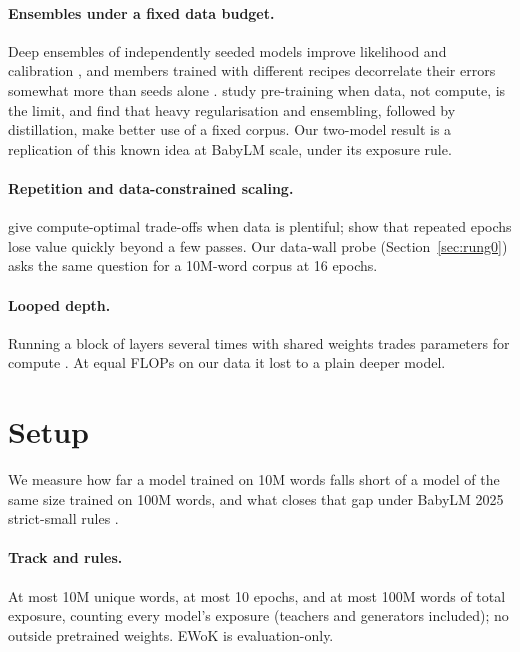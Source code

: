 \documentclass[11pt]{article}
\begin{document}
\paragraph{Ensembles under a fixed data budget.} Deep ensembles of independently seeded models improve likelihood and
calibration \citep{lakshminarayanan2017}, and members trained with different recipes decorrelate their errors somewhat
more than seeds alone \citep{gontijolopes2022}. \citet{kim2025infinite} study pre-training when data, not compute, is
the limit, and find that heavy regularisation and ensembling, followed by distillation, make better use of a fixed
corpus. Our two-model result is a replication of this known idea at BabyLM scale, under its exposure rule.

\paragraph{Repetition and data-constrained scaling.} \citet{hoffmann2022chinchilla} give compute-optimal trade-offs when
data is plentiful; \citet{muennighoff2023scaling} show that repeated epochs lose value quickly beyond a few passes. Our
data-wall probe (Section~\ref{sec:rung0}) asks the same question for a 10M-word corpus at 16 epochs.

\paragraph{Looped depth.} Running a block of layers several times with shared weights trades parameters for compute
\citep{chen2026looped,parcae2026,ouro2025}. At equal FLOPs on our data it lost to a plain deeper model.

\section{Setup}
\label{sec:setup}
We measure how far a model trained on 10M words falls short of a model of the same size trained on 100M words, and what closes
that gap under BabyLM 2025 strict-small rules \citep{babylm2025}.

\paragraph{Track and rules.} At most 10M unique words, at most 10 epochs, and at most 100M words of total exposure,
counting every model's exposure (teachers and generators included); no outside pretrained weights. EWoK
\citep{ivanova2024ewok} is evaluation-only.
\end{document}
